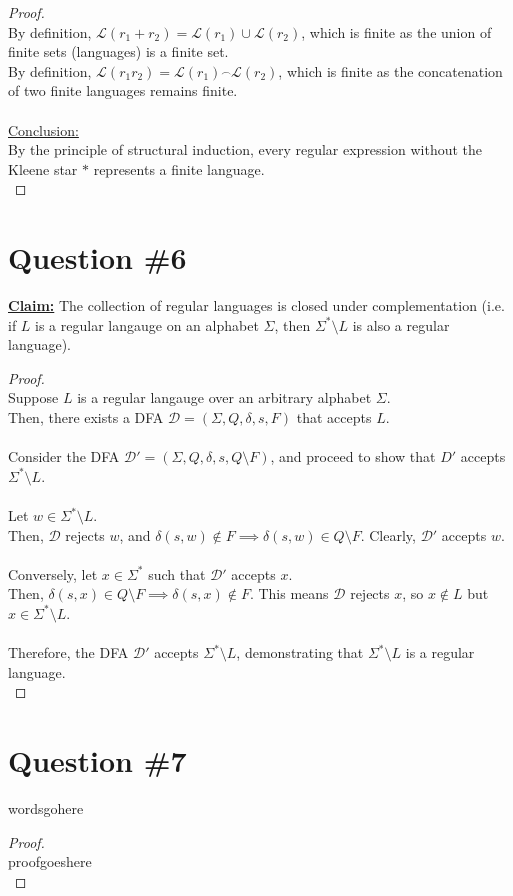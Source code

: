 \documentclass[12pt]{article}
\begin{document}
\begin{proof}
    \\
    By definition, \( \mathcal{L}(r_1 + r_2) = \mathcal{L}(r_1) \cup \mathcal{L}(r_2) \), which is finite as the union of finite sets (languages) is a finite set. \\
    By definition, \( \mathcal{L}(r_1 r_2) = \mathcal{L}(r_1) \overset{\frown}{\ } \mathcal{L}(r_2) \), which is finite as the concatenation of two finite languages remains finite. \\
    \\
    \underline{Conclusion:} \\
    By the principle of structural induction, every regular expression without the Kleene star \( * \) represents a finite language. \\
\end{proof}
\pagebreak

\section*{Question \#6}
\textbf{\underline{Claim:}} The collection of regular languages is closed under complementation (i.e. if \( L \) is a regular langauge on an alphabet \( \Sigma \), then \( \Sigma^* \setminus L \) is also a regular language).
\begin{proof}
\leavevmode\\
    Suppose \( L \) is a regular langauge over an arbitrary alphabet \( \Sigma \). \\
    Then, there exists a DFA \( \mathcal{D} = (\Sigma, Q, \delta, s, F) \) that accepts \( L \). \\
    \\
    Consider the DFA \( \mathcal{D}' = (\Sigma, Q, \delta, s, Q \setminus F) \), and proceed to show that \( D' \) accepts \( \Sigma^* \setminus L \). \\
    \\
    Let \( w \in \Sigma^* \setminus L \). \\
    Then, \( \mathcal{D} \) rejects \( w \), and \( \delta(s, w) \notin F \implies \delta(s, w) \in Q \setminus F \). Clearly, \( \mathcal{D}' \) accepts \( w \). \\
    \\
    Conversely, let \( x \in \Sigma^* \) such that \( \mathcal{D}' \) accepts \( x \). \\
    Then, \( \delta(s, x) \in Q \setminus F \implies \delta(s, x) \notin F \). This means \( \mathcal{D} \) rejects \( x \), so \( x \notin L \) but \( x \in \Sigma^* \setminus L \). \\
    \\
    Therefore, the DFA \( \mathcal{D}' \) accepts \( \Sigma^* \setminus L \), demonstrating that \( \Sigma^* \setminus L \) is a regular language. \\
\end{proof}
\pagebreak

\section*{Question \#7}
wordsgohere

\begin{proof}
\leavevmode\\
    proofgoeshere \\
\end{proof}
\pagebreak
\end{document}

